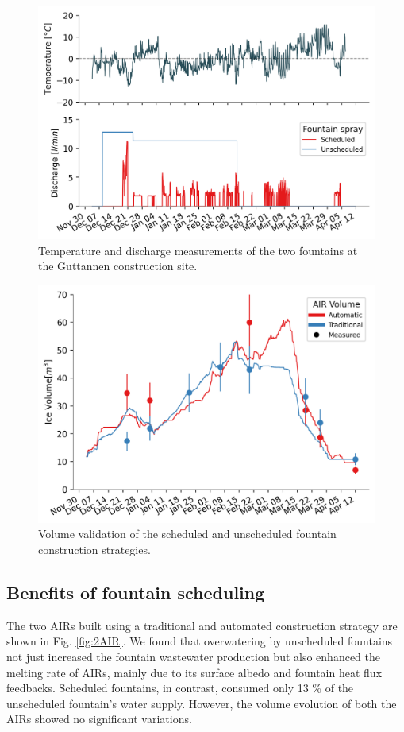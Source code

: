 \begin{figure}[htb]
\includegraphics[width=12cm]{figs/disvstemp.png}
\caption{Temperature and discharge measurements of the two fountains at the Guttannen construction site.}
\label{fig:disvstemp}
\end{figure}

\begin{figure}[htb]
\includegraphics[width=12cm]{figs/auto_validation.png}
\caption{Volume validation of the scheduled and unscheduled fountain construction strategies.} 
\label{fig:auto_validation} \end{figure}

\subsection{Benefits of fountain scheduling}

The two AIRs built using a traditional and automated construction strategy are shown in Fig. \ref{fig:2AIR}. We
found that overwatering by unscheduled fountains not just increased the fountain wastewater production but also
enhanced the melting rate of AIRs, mainly due to its surface albedo and fountain heat flux feedbacks. Scheduled
fountains, in contrast, consumed only 13 \% of the unscheduled fountain's water supply. However, the volume
evolution of both the AIRs showed no significant variations. 


